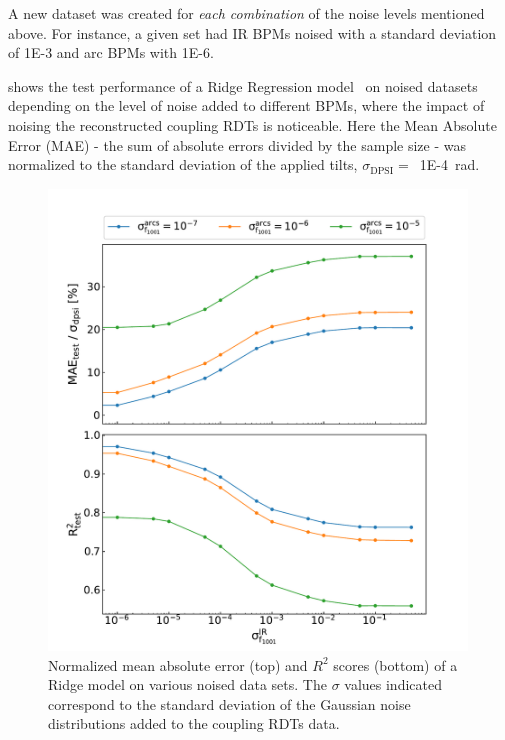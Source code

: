 A new dataset was created for \textit{each combination} of the noise levels mentioned above.
For instance, a given set had IR BPMs noised with a standard deviation of \num{1E-3} and arc BPMs with \num{1E-6}.

 shows the test performance of a Ridge Regression model~\cite{MIT:Rifkin:Regularized_Least_Squares} on noised datasets depending on the level of noise added to different BPMs, where the impact of noising the reconstructed coupling RDTs is noticeable.
Here the Mean Absolute Error (MAE) - the sum of absolute errors divided by the sample size - was normalized to the standard deviation of the applied tilts, \(\sigma_{\mathrm{DPSI}} =\)~\qty{1E-4}{\radian}.

\begin{figure}[!htb]
    \centering
    \includegraphics*[width=0.99\textwidth]{Figures/ML_for_IR_Coupling/ml_ridge_performance.pdf}
    \caption{Normalized mean absolute error (top) and \(R^2\) scores (bottom) of a Ridge model on various noised data sets. The \(\sigma\) values indicated correspond to the standard deviation of the Gaussian noise distributions added to the coupling RDTs data.}
    \label{figure:ridge_performance}
\end{figure}

